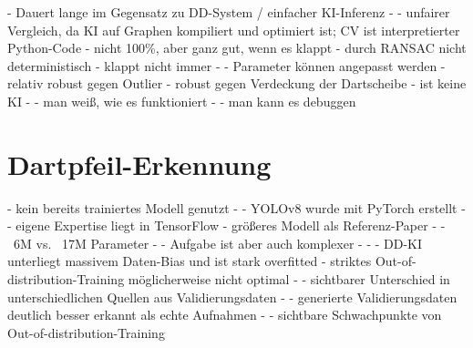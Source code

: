 - Dauert lange im Gegensatz zu DD-System / einfacher KI-Inferenz
- - unfairer Vergleich, da KI auf Graphen kompiliert und optimiert ist; CV ist interpretierter Python-Code
- nicht 100\%, aber ganz gut, wenn es klappt
- durch RANSAC nicht deterministisch
- klappt nicht immer
- - Parameter können angepasst werden
- relativ robust gegen Outlier
- robust gegen Verdeckung der Dartscheibe
- ist keine KI
- - man weiß, wie es funktioniert
- - man kann es debuggen


\section{Dartpfeil-Erkennung}
\label{sec:diskussion:ki}


- kein bereits trainiertes Modell genutzt
- - YOLOv8 wurde mit PyTorch erstellt
- - eigene Expertise liegt in TensorFlow
- größeres Modell als Referenz-Paper
- - ~6M vs. ~17M Parameter
- - Aufgabe ist aber auch komplexer
- - - DD-KI unterliegt massivem Daten-Bias und ist stark overfitted
- striktes Out-of-distribution-Training möglicherweise nicht optimal
- - sichtbarer Unterschied in unterschiedlichen Quellen aus Validierungsdaten
- - generierte Validierungsdaten deutlich besser erkannt als echte Aufnahmen
- - sichtbare Schwachpunkte von Out-of-distribution-Training

